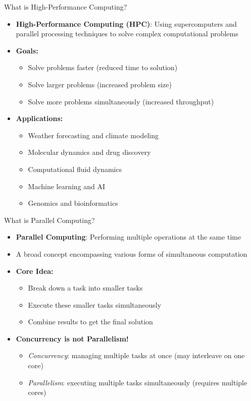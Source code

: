 \documentclass[aspectratio=169,xcolor={dvipsnames}]{beamer}
\begin{document}
\begin{frame}{What is High-Performance Computing?}
    \begin{itemize}
        \item \textbf{High-Performance Computing (HPC)}: Using supercomputers and parallel processing techniques to solve complex computational problems
        \item \textbf{Goals:}
        \begin{itemize}
            \item Solve problems faster (reduced time to solution)
            \item Solve larger problems (increased problem size)
            \item Solve more problems simultaneously (increased throughput)
        \end{itemize}
        \item \textbf{Applications:}
        \begin{itemize}
            \item Weather forecasting and climate modeling
            \item Molecular dynamics and drug discovery
            \item Computational fluid dynamics
            \item Machine learning and AI
            \item Genomics and bioinformatics
        \end{itemize}
    \end{itemize}
\end{frame}

\begin{frame}{What is Parallel Computing?}
    \begin{itemize}
        \item \textbf{Parallel Computing}: Performing multiple operations at the same time
        \item A broad concept encompassing various forms of simultaneous computation
        \item \textbf{Core Idea:}
        \begin{itemize}
            \item Break down a task into smaller tasks
            \item Execute these smaller tasks simultaneously
            \item Combine results to get the final solution
        \end{itemize}
        \item \textbf{Concurrency is not Parallelism!}
        \begin{itemize}
            \item \textit{Concurrency}: managing multiple tasks at once (may interleave on one core)
            \item \textit{Parallelism}: executing multiple tasks simultaneously (requires multiple cores)
        \end{itemize}
    \end{itemize}
\end{frame}
\end{document}
